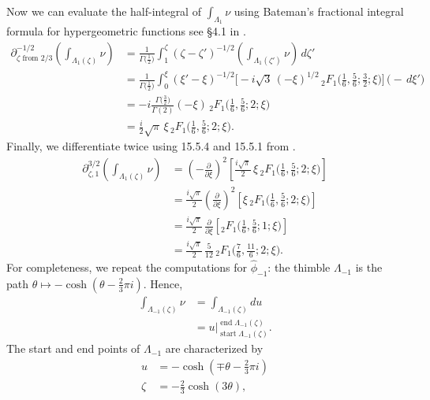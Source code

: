 \documentclass{article}
\theoremstyle{definition}
\newcommand{\fracderiv}[3]{\partial^{#1}_{#2, #3}}
\begin{document}
Now we can evaluate the half-integral of $\int_{\Lambda_1} \nu$ using Bateman's fractional integral formula for hypergeometric functions see \S 4.1 in \cite{koornwinder2015fractional}.
\begin{align*}
\partial^{-1/2}_{\zeta \text{ from } 2/3} \left( \int_{\Lambda_1(\zeta)} \nu \right) & = \frac{1}{\Gamma\big(\tfrac{1}{2}\big)} \int_{1}^\zeta (\zeta - \zeta')^{-1/2} \left( \int_{\Lambda_1(\zeta')} \nu \right)\,d\zeta' \\
& = \frac{1}{\Gamma\big(\tfrac{1}{2}\big)} \int_0^\xi  (\xi' - \xi)^{-1/2} \Big[ -{i}{\sqrt{3}}\, (-\xi)^{1/2}\,{}_2F_1\big(\tfrac{1}{6}, \tfrac{5}{6}; \tfrac{3}{2}; \xi\big) \Big] \,\big( -\,d\xi' \big) \\
& = -i \frac{\Gamma\big(\tfrac{3}{2}\big)}{\Gamma(2)} (-\xi)\,{}_2F_1\big(\tfrac{1}{6}, \tfrac{5}{6}; 2; \xi\big) \\
& = \frac{i}{2} \sqrt{\pi}\,\xi\, {}_2F_1\big(\tfrac{1}{6}, \tfrac{5}{6}; 2; \xi\big).
\end{align*}
Finally, we differentiate twice using 15.5.4 and 15.5.1 from \cite{dlmf}.
\begin{align*}
\fracderiv{3/2}{\zeta}{1} \left( \int_{\Lambda_1(\zeta)} \nu \right) & = \left(-\tfrac{\partial}{\partial \xi}\right)^2 \left[ \frac{i\sqrt{\pi}}{2}\,\xi\, {}_2F_1\big(\tfrac{1}{6}, \tfrac{5}{6}; 2; \xi\big) \right] \\
& =  \tfrac{i\sqrt{\pi}}{2} \left(\tfrac{\partial}{\partial \xi}\right)^2 \left[ \xi\,{}_2F_1\big(\tfrac{1}{6}, \tfrac{5}{6}; 2; \xi\big) \right] \\
& = \tfrac{i\sqrt{\pi}}{2}\,\tfrac{\partial}{\partial \xi} \left[ {}_2F_1\big(\tfrac{1}{6}, \tfrac{5}{6}; 1; \xi\big) \right] \\
& = \tfrac{i\sqrt{\pi}}{2}\,\tfrac{5}{12}\, {}_2F_1\big(\tfrac{7}{6}, \tfrac{11}{6}; 2; \xi\big).
\end{align*}
%
For completeness, we repeat the computations for $\hat{\phi}_{-1}$: the thimble $\Lambda_{-1}$ is the path $\theta \mapsto -\cosh(\theta - \tfrac{2}{3}\pi i)$. Hence,
\begin{align*}
\int_{\Lambda_{-1}(\zeta)} \nu & = \int_{\Lambda_{-1}(\zeta)} du \\
& = u \Big|_{\operatorname{start} \Lambda_{-1}(\zeta)}^{\operatorname{end}\Lambda_{-1}(\zeta)}.
\end{align*}
The start and end points of $\Lambda_{-1}$ are characterized by
\begin{align*}
u & = -\cosh(\mp\theta - \tfrac{2}{3}\pi i) \\
\zeta & = -\tfrac{2}{3} \cosh(3\theta),
\end{align*}
\end{document}
